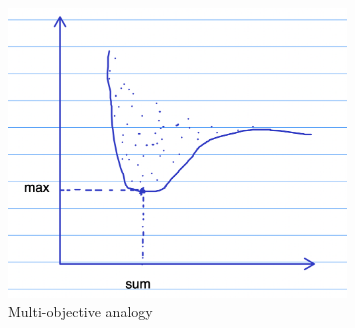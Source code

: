 \begin{figure}[h!]
\centering
\includegraphics[width=0.8\textwidth]{assets/multiobjective.png}
\caption{Multi-objective analogy}
\label{fig:multiobjective}
\end{figure}
